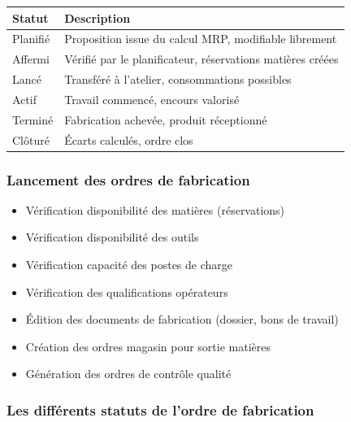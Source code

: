 \documentclass{article}
\begin{document}
\begin{table}[h]
\begin{table}[h]
\centering
\begin{tabular}{|p{}|p{}|}
\hline
\textbf{Statut} & \textbf{Description} \\
\hline
Planifié & Proposition issue du calcul MRP, modifiable librement \\
Affermi & Vérifié par le planificateur, réservations matières créées \\
Lancé & Transféré à l'atelier, consommations possibles \\
Actif & Travail commencé, encours valorisé \\
Terminé & Fabrication achevée, produit réceptionné \\
Clôturé & Écarts calculés, ordre clos \\
\hline
\end{tabular}
\end{table}

\subsubsection{Lancement des ordres de fabrication}

\begin{tcolorbox}[colback=vertclair, colframe=green!50!black, title=Contrôles avant lancement]
\begin{itemize}
    \item Vérification disponibilité des matières (réservations)
    \item Vérification disponibilité des outils
    \item Vérification capacité des postes de charge
    \item Vérification des qualifications opérateurs
    \item Édition des documents de fabrication (dossier, bons de travail)
    \item Création des ordres magasin pour sortie matières
    \item Génération des ordres de contrôle qualité
\end{itemize}
\end{tcolorbox}

\subsubsection{Les différents statuts de l'ordre de fabrication}


\end{table}
\end{document}
